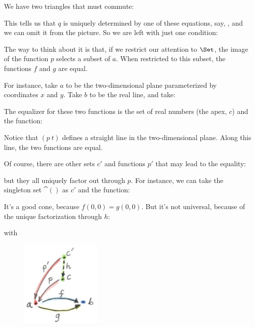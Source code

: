 \noindent
We have two triangles that must commute:


This tells us that $q$ is uniquely determined by one of these
equations, say, , and we can omit it from the
picture. So we are left with just one condition:


The way to think about it is that, if we restrict our attention to
$\Set$, the image of the function $p$ selects a subset of
$a$. When restricted to this subset, the functions $f$ and
$g$ are equal.

For instance, take $a$ to be the two-dimensional plane
parameterized by coordinates $x$ and $y$. Take $b$
to be the real line, and take:


The equalizer for these two functions is the set of real numbers (the
apex, $c$) and the function:


Notice that $(p~t)$ defines a straight line in the
two-dimensional plane. Along this line, the two functions are equal.

Of course, there are other sets $c'$ and functions
$p'$ that may lead to the equality:


but they all uniquely factor out through $p$. For instance, we
can take the singleton set $\cat{()}$ as $c'$ and the
function:


It's a good cone, because $f (0, 0) = g (0, 0)$. But it's
not universal, because of the unique factorization through $h$:


with


\begin{figure}[H]
\centering
\includegraphics[width=40mm]{images/equilizerlimit.jpg}
\end{figure}

